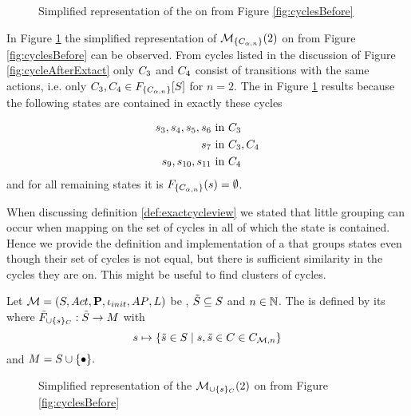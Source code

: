 \documentclass[preview]{standalone}
\begin{document}
\begin{figure}[h]
	\centering	
		
	\caption{Simplified representation of the \viewN \viewcycleset on \mdp from Figure \ref{fig:cyclesBefore}}
	\label{fig:cycleAfterExactAct2}
\end{figure}

In Figure \ref{fig:cycleAfterExactAct2} the simplified representation of ${{{{{\mathcal{M}}}}_{{\{{C}_{{\alpha},n}\}}}}}(2)$ on \chgph from Figure \ref{fig:cyclesBefore} can be observed. From cycles listed in the discussion of Figure \ref{fig:cycleAfterExtact} only ${C}_3$ and ${C}_4$ consist of transitions with the same actions, i.e. only ${C}_3, {C}_4 \in {\ensuremath{{F_{{\{{C}_{{\alpha},n}\}}}}}}[{S}]$ for $n = 2$. The \viewN \viewexactactcycle in Figure \ref{fig:cycleAfterExactAct2} results because the following states are contained in exactly these cycles

\begin{align*}
	{s}_3, {s}_4, {s}_5, {s}_6 &\text{ in } {C}_3 \\
	{s}_7 &\text{ in } {C}_3, {C}_4 \\
	{s}_9, {s}_{10}, {s}_{11} &\text{ in } {C}_4
\end{align*}
and for all remaining states \states it is ${{F_{{\{{C}_{{\alpha},n}\}}}}}({s}) = \emptyset$.

When discussing definition \ref{def:exactcycleview} we stated that little grouping can occur when mapping on the set of cycles in all of which the state is contained. Hence we provide the definition and implementation of a \viewN that groups states even though their set of cycles is not equal, but there is sufficient similarity in the cycles they are on. This might be useful to find clusters of cycles.

\begin{definition}
	Let ${{{\mathcal{M}}}} = {{({S}, {Act}, {\textbf{P}}, {\iota_{init}}, {AP}, {L})}}$ be \achgphN, ${\tilde{{S}}} \subseteq {S}$ and $n \in {\mathbb{N}}$. The \viewN \viewcycleset is defined by its \grpfctN \gfctcycleset where $\gfctsubcycleset : \smstates \to \imggrp$ with
	\[
	\state \mapsto \{\smstate \in \states \mid \state, \smstate \in \cycle \in \cycleset\}
	\]
	and $\imggrp = \states \cup \remset.$
\end{definition}

\begin{figure}[h]
	\centering
	
	\caption{Simplified representation of the \viewN $\viewcycleset(2)$ on \mdp from Figure \ref{fig:cyclesBefore}} 
	\label{fig:cycleAfterSet0}  
\end{figure}
\end{document}
